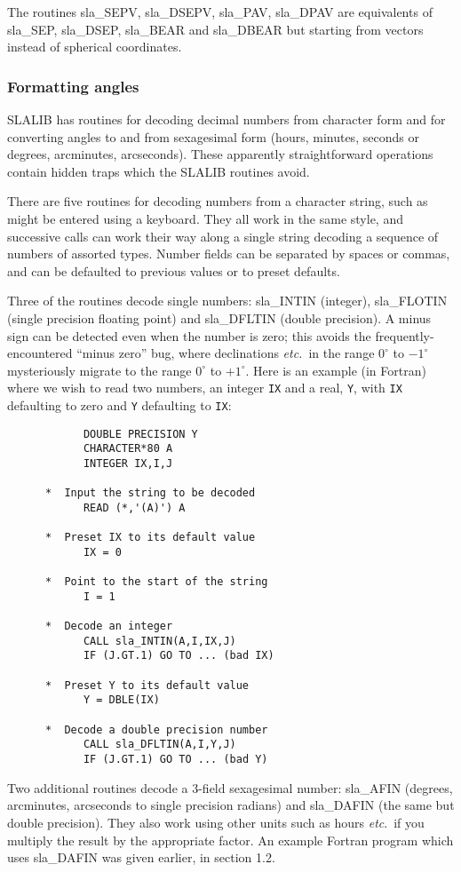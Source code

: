 \documentclass[11pt,twoside]{article}
\begin{document}
The routines
sla\_SEPV,
sla\_DSEPV,
sla\_PAV,
sla\_DPAV
are equivalents of sla\_SEP, sla\_DSEP, sla\_BEAR and sla\_DBEAR
but starting from vectors
instead of spherical coordinates.

\subsubsection{Formatting angles}
SLALIB has routines for decoding decimal numbers
from character form and for converting angles to and from
sexagesimal form (hours, minutes, seconds or degrees,
arcminutes, arcseconds).  These apparently straightforward
operations contain hidden traps which the SLALIB routines
avoid.

There are five routines for decoding numbers from a character
string, such as might be entered using a keyboard.
They all work in the same style, and successive calls
can work their way along a single string decoding
a sequence of numbers of assorted types.  Number
fields can be separated by spaces or commas, and can be defaulted
to previous values or to preset defaults.

Three of the routines decode single numbers:
sla\_INTIN
(integer),
sla\_FLOTIN
(single precision floating point) and
sla\_DFLTIN
(double precision).  A minus sign can be
detected even when the number is zero;  this avoids
the frequently-encountered ``minus zero'' bug, where
declinations {\it etc.}\ in
the range $0^{\circ}$ to $-1^{\circ}$ mysteriously migrate to
the range $0^{\circ}$ to $+1^{\circ}$.
Here is an example (in Fortran) where we wish to
read two numbers, an integer {\tt IX} and a real, {\tt Y},
with {\tt IX} defaulting to zero and {\tt Y} defaulting to
{\tt IX}:
\goodbreak
\begin{verbatim}
            DOUBLE PRECISION Y
            CHARACTER*80 A
            INTEGER IX,I,J

      *  Input the string to be decoded
            READ (*,'(A)') A

      *  Preset IX to its default value
            IX = 0

      *  Point to the start of the string
            I = 1

      *  Decode an integer
            CALL sla_INTIN(A,I,IX,J)
            IF (J.GT.1) GO TO ... (bad IX)

      *  Preset Y to its default value
            Y = DBLE(IX)

      *  Decode a double precision number
            CALL sla_DFLTIN(A,I,Y,J)
            IF (J.GT.1) GO TO ... (bad Y)
\end{verbatim}
\goodbreak
Two additional routines decode a 3-field sexagesimal number:
sla\_AFIN
(degrees, arcminutes, arcseconds to single
precision radians) and
sla\_DAFIN
(the same but double precision).  They also
work using other units such as hours {\it etc}.\ if
you multiply the result by the appropriate factor.  An example
Fortran program which uses
sla\_DAFIN
was given earlier, in section 1.2.
\end{document}
